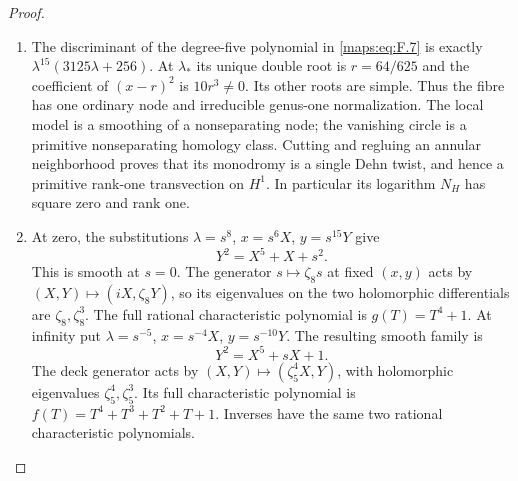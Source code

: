 \begin{proof}
\begin{enumerate}[label=\arabic*.]
\item The discriminant of the degree-five polynomial in \eqref{maps:eq:F.7} is exactly
$\lambda^{15}(3125\lambda+256)$.  At $\lambda_*$ its unique double
root is $r=64/625$ and the coefficient of $(x-r)^2$ is
$10r^3\ne0$.  Its other roots are simple.  Thus the fibre has one
ordinary node and irreducible genus-one normalization.  The local
model is a smoothing of a nonseparating node; the vanishing circle
is a primitive nonseparating homology class.  Cutting and regluing
an annular neighborhood proves that its monodromy is a single
Dehn twist, and hence a primitive rank-one transvection on $H^1$.
In particular its logarithm $N_H$ has square zero and rank one.

\item At zero, the substitutions $\lambda=s^8$, $x=s^6X$, $y=s^{15}Y$
give
\[
 Y^2=X^5+X+s^2.
\]
This is smooth at $s=0$.  The generator $s\mapsto\zeta_8s$ at
fixed $(x,y)$ acts by $(X,Y)\mapsto(iX,\zeta_8Y)$, so its
eigenvalues on the two holomorphic differentials are
$\zeta_8,\zeta_8^3$.  The full rational characteristic polynomial
is $g(T)=T^4+1$.
At infinity put $\lambda=s^{-5}$, $x=s^{-4}X$, $y=s^{-10}Y$.
The resulting smooth family is
\[
 Y^2=X^5+sX+1.
\]
The deck generator acts by $(X,Y)\mapsto(\zeta_5^4X,Y)$,
with holomorphic eigenvalues $\zeta_5^4,\zeta_5^3$.  Its full
characteristic polynomial is $f(T)=T^4+T^3+T^2+T+1$.
Inverses have the same two rational characteristic polynomials.


\end{enumerate}
\end{proof}
